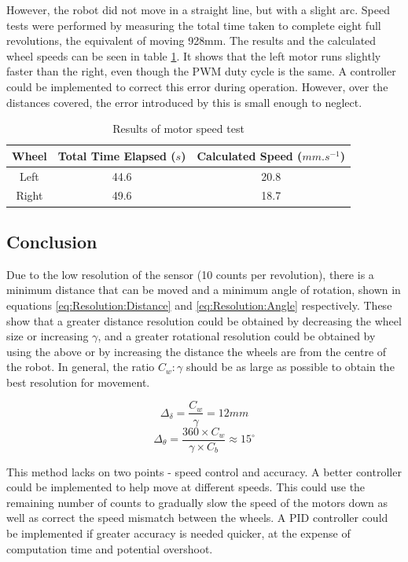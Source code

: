 However, the robot did not move in a straight line, but with a slight arc. Speed tests were performed by measuring the total time taken to complete eight full revolutions, the equivalent of moving 928mm. The results and the calculated wheel speeds can be seen in table \ref{table:results:motor:speed}. It shows that the left motor runs slightly faster than the right, even though the PWM duty cycle is the same. A controller could be implemented to correct this error during operation. However, over the distances covered, the error introduced by this is small enough to neglect. 

\begin{table}
\caption{Results of motor speed test}
\label{table:results:motor:speed}
\centering
\begin{tabular}{ccc} \toprule
Wheel &	Total Time Elapsed ($s$) & Calculated Speed ($mm.s^{-1}$) \\ \toprule
Left & 44.6		&	20.8 \\ \midrule
Right & 49.6	&	18.7 \\ \bottomrule
\end{tabular}
\end{table}

\subsection{Conclusion}
Due to the low resolution of the sensor (10 counts per revolution), there is a minimum distance that can be moved and a minimum angle of rotation, shown in equations \eqref{eq:Resolution:Distance} and \eqref{eq:Resolution:Angle} respectively. These show that a greater distance resolution could be obtained by decreasing the wheel size or increasing $\gamma$, and a greater rotational resolution could be obtained by using the above or by increasing the distance the wheels are from the centre of the robot. In general, the ratio $C_w:\gamma$ should be as large as possible to obtain the best resolution for movement.


\begin{equation}\label{eq:Resolution:Distance}
\Delta_{\delta} = \frac{C_w}{\gamma} = 12mm
\end{equation}
\begin{equation}\label{eq:Resolution:Angle}
\Delta_{\theta} = \frac{360 \times C_w}{\gamma \times C_b} \approx 15^\circ 
\end{equation}

This method lacks on two points - speed control and accuracy.
A better controller could be implemented to help move at different speeds. This could use the remaining number of counts to gradually slow the speed of the motors down as well as correct the speed mismatch between the wheels. A PID controller could be implemented if greater accuracy is needed quicker, at the expense of computation time and potential overshoot. 

